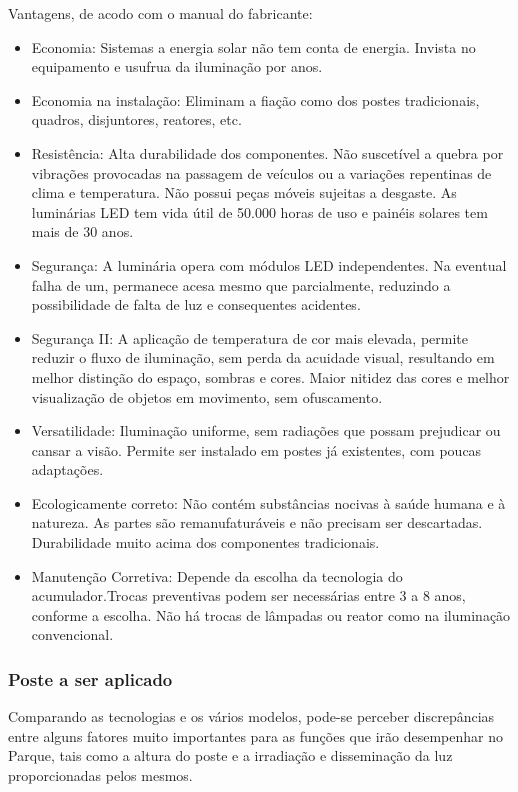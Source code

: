 \begin{itemize}
    Vantagens, de acodo com o manual do fabricante:
    \begin{itemize}
    \item Economia: Sistemas a energia solar não tem conta de energia. Invista no equipamento e usufrua da iluminação por anos.
	\item Economia na instalação: Eliminam a fiação como dos postes tradicionais, quadros, disjuntores, reatores, etc.
	\item Resistência: Alta durabilidade dos componentes. Não suscetível a quebra por vibrações provocadas na passagem de veículos ou a variações repentinas de clima e temperatura. Não possui peças móveis sujeitas a desgaste. As luminárias LED tem vida útil de 50.000 horas de uso e painéis solares tem mais de 30 anos.
	\item Segurança: A luminária opera com módulos LED independentes. Na eventual falha de um, permanece acesa mesmo que parcialmente, reduzindo a possibilidade de falta de luz e consequentes acidentes.
	\item Segurança II: A aplicação de temperatura de cor mais elevada, permite reduzir o  fluxo de iluminação, sem perda da acuidade visual, resultando em melhor distinção do espaço, sombras e cores. Maior nitidez das cores e melhor visualização de objetos em movimento, sem ofuscamento.
 	\item Versatilidade: Iluminação uniforme, sem radiações que possam prejudicar ou cansar a visão. Permite ser instalado em postes já existentes, com poucas adaptações.
	\item Ecologicamente correto: Não contém substâncias nocivas à saúde humana e à natureza. As partes são remanufaturáveis e não precisam ser descartadas. Durabilidade muito acima dos componentes tradicionais.
	\item Manutenção Corretiva: Depende da escolha da tecnologia do acumulador.Trocas preventivas podem ser necessárias entre 3 a 8 anos, conforme a escolha.  Não há trocas de lâmpadas ou reator como na iluminação convencional.
    \end{itemize}

\end{itemize}

\subsubsection{Poste a ser aplicado}
	Comparando as tecnologias e os vários modelos, pode-se perceber discrepâncias  entre alguns fatores muito importantes para as funções que irão desempenhar no Parque, tais como a altura do poste e a irradiação e disseminação da luz proporcionadas pelos mesmos. 
	
